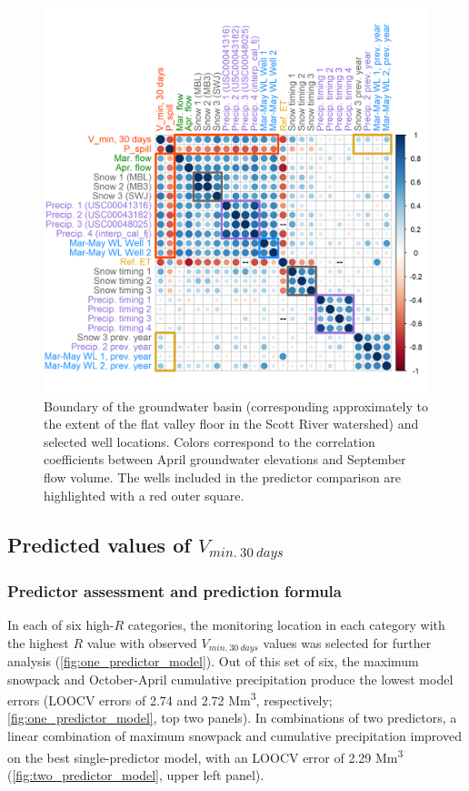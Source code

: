\documentclass[hess, manuscript]{copernicus}
\begin{document}
\begin{figure}
\includegraphics[width=1\linewidth]{f08} \caption{\label{fig:gw_vs_fall_flows_corr_map} Boundary of the groundwater basin (corresponding approximately to the extent of the flat valley floor in the Scott River watershed) and selected well locations. Colors correspond to the correlation coefficients between April groundwater elevations and September flow volume. The wells included in the predictor comparison are highlighted with a red outer square.}\label{fig:gw_vs_fall_flows_corr_map}
\end{figure}

\subsection{\texorpdfstring{Predicted values of
\(V_{min.~30~days}\)}{Predicted values of V\_\{min.\textasciitilde30\textasciitilde days\}}}

\subsubsection{Predictor assessment and prediction formula}

In each of six high-\(R\) categories, the monitoring location in each
category with the highest \(R\) value with observed \(V_{min.~30~days}\)
values was selected for further analysis
(\autoref{fig:one_predictor_model}). Out of this set of six, the maximum
snowpack and October-April cumulative precipitation produce the lowest
model errors (LOOCV errors of 2.74 and 2.72 Mm\textsuperscript{3},
respectively; \autoref{fig:one_predictor_model}, top two panels). In
combinations of two predictors, a linear combination of maximum snowpack
and cumulative precipitation improved on the best single-predictor
model, with an LOOCV error of 2.29 Mm\textsuperscript{3}
(\autoref{fig:two_predictor_model}, upper left panel).
\end{document}
